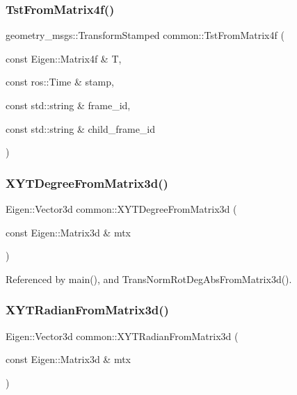 \subsubsection{\texorpdfstring{Tst\+From\+Matrix4f()}{TstFromMatrix4f()}}
{\footnotesize\ttfamily geometry\+\_\+msgs\+::\+Transform\+Stamped common\+::\+Tst\+From\+Matrix4f (\begin{DoxyParamCaption}\item[{const Eigen\+::\+Matrix4f \&}]{T,  }\item[{const ros\+::\+Time \&}]{stamp,  }\item[{const std\+::string \&}]{frame\+\_\+id,  }\item[{const std\+::string \&}]{child\+\_\+frame\+\_\+id }\end{DoxyParamCaption})}

\mbox{\label{namespacecommon_ac2334937b8f4c3b74ba6393a30876499}} 
\subsubsection{\texorpdfstring{X\+Y\+T\+Degree\+From\+Matrix3d()}{XYTDegreeFromMatrix3d()}}
{\footnotesize\ttfamily Eigen\+::\+Vector3d common\+::\+X\+Y\+T\+Degree\+From\+Matrix3d (\begin{DoxyParamCaption}\item[{const Eigen\+::\+Matrix3d \&}]{mtx }\end{DoxyParamCaption})}



Referenced by main(), and Trans\+Norm\+Rot\+Deg\+Abs\+From\+Matrix3d().

\mbox{\label{namespacecommon_a380c663a4f46d093dca7813385d5472c}} 
\subsubsection{\texorpdfstring{X\+Y\+T\+Radian\+From\+Matrix3d()}{XYTRadianFromMatrix3d()}}
{\footnotesize\ttfamily Eigen\+::\+Vector3d common\+::\+X\+Y\+T\+Radian\+From\+Matrix3d (\begin{DoxyParamCaption}\item[{const Eigen\+::\+Matrix3d \&}]{mtx }\end{DoxyParamCaption})}




